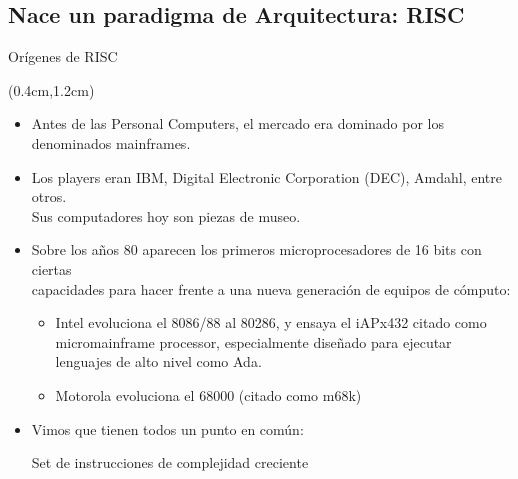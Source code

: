 \documentclass[table,dvipsnames,aspectratio=169]{beamer}
\begin{document}
\subsection{Nace un paradigma de Arquitectura: RISC}
\begin{frame}{Orígenes de RISC}
 \begin{textblock*}{\textwidth}(0.4cm,1.2cm)
  \begin{itemize}[<+(1)->]\justifying \parskip 0.2cm
   \item Antes de las Personal Computers, \textcolor{furfiBlue}{el mercado era dominado por los denominados mainframes}.
   \item Los players eran IBM, Digital Electronic Corporation (DEC), Amdahl, entre otros.\\
   \textcolor{furfiBlue}{Sus computadores hoy son piezas de museo.}
   \item Sobre los años 80 aparecen los primeros microprocesadores de 16 bits con ciertas\\
   capacidades para hacer frente a una nueva generación de equipos de cómputo:
   \begin{itemize}
    \item Intel evoluciona el 8086/88 al 80286, y ensaya el iAPx432 citado como micromainframe processor, especialmente diseñado para ejecutar lenguajes de alto nivel como Ada.
    \item Motorola evoluciona el 68000 (citado como m68k)
   \end{itemize}
   \item Vimos que tienen todos un punto en común:\\
   \begin{center}
    \textcolor{furfiBlue}{Set de instrucciones de complejidad creciente}
   \end{center}
  \end{itemize}
 \end{textblock*}
\end{frame}
\end{document}
